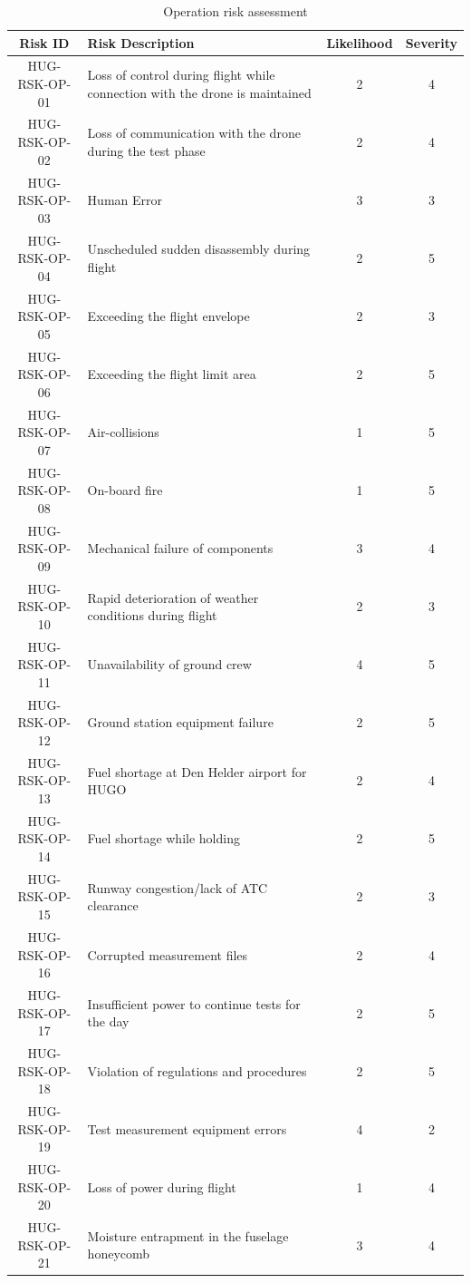 \begin{table}[H]
    \centering
    \caption{Operation risk assessment}
    \begin{tabular}{|c|p{9cm}|c|c|}
    \hline
       \textbf{Risk ID}  & \textbf{Risk Description} & \textbf{Likelihood} & \textbf{Severity} \\ \hline \hline
        HUG-RSK-OP-01 & Loss of control during flight while connection with the drone is maintained & 2 & 4 \\ \hline
        HUG-RSK-OP-02 & Loss of communication with the drone during the test phase & 2 & 4 \\ \hline
        HUG-RSK-OP-03 & Human Error & 3 & 3 \\ \hline
        HUG-RSK-OP-04 & Unscheduled sudden disassembly during flight & 2 & 5 \\ \hline
        HUG-RSK-OP-05 & Exceeding the flight envelope & 2 & 3 \\ \hline
        HUG-RSK-OP-06 & Exceeding the flight limit area & 2 & 5 \\ \hline
        HUG-RSK-OP-07 & Air-collisions & 1 & 5 \\ \hline
        HUG-RSK-OP-08 & On-board fire & 1 & 5 \\ \hline
        HUG-RSK-OP-09 & Mechanical failure of components & 3 & 4 \\ \hline
        HUG-RSK-OP-10 & Rapid deterioration of weather conditions during flight & 2 & 3 \\\hline 
        HUG-RSK-OP-11 &  Unavailability of ground crew  & 4 & 5 \\ \hline
        HUG-RSK-OP-12 &  Ground station equipment failure  & 2 & 5 \\ \hline
        HUG-RSK-OP-13 &  Fuel shortage at Den Helder airport for HUGO  & 2 & 4 \\ \hline
        HUG-RSK-OP-14 &  Fuel shortage while holding  & 2 & 5 \\ \hline
        HUG-RSK-OP-15 &  Runway congestion/lack of ATC clearance  & 2 & 3 \\ \hline
        HUG-RSK-OP-16 &  Corrupted measurement files  & 2 & 4 \\ \hline
        HUG-RSK-OP-17 &  Insufficient power to continue tests for the day  & 2 & 5 \\ \hline
        HUG-RSK-OP-18 & Violation of regulations and procedures & 2 & 5 \\ \hline
        HUG-RSK-OP-19 & Test measurement equipment errors & 4 & 2 \\ \hline
        HUG-RSK-OP-20 & Loss of power during flight  & 1 & 4 \\ \hline
        HUG-RSK-OP-21 & Moisture entrapment in the fuselage honeycomb & 3 & 4 \\\hline
    \end{tabular}
    \label{tab:operation_risks}
\end{table}


